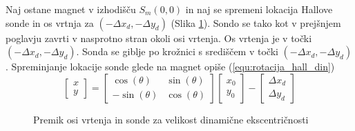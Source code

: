 Naj ostane magnet v izhodišču $S_m(0,0)$ in naj se spremeni lokacija Hallove sonde in os vrtnja za $(-\Delta x_d,-\Delta y_d)$ (Slika \ref{fig:def_din_eksbac}). Sondo se tako kot v prejšnjem poglavju zavrti 
v nasprotno stran okoli osi vrtenja. Os vrtenja je v točki $(-\Delta x_d,-\Delta y_d)$. Sonda se giblje po krožnici s središčem v točki $(-\Delta x_d,-\Delta y_d)$. Spreminjanje lokacije sonde glede na 
magnet opiše (\ref{equ:rotacija_hall_din})
\begin{equation}
\label{equ:rotacija_hall_din}
\begin{bmatrix} x\\y \end{bmatrix}=
\begin{bmatrix} \cos(\theta)&\sin(\theta)\\-\sin(\theta)&\cos(\theta) \end{bmatrix}
\begin{bmatrix} x_0\\y_0 \end{bmatrix}
-
\begin{bmatrix} \Delta x_d\\\Delta y_d \end{bmatrix}
\end{equation}
\begin{figure}[!ht]
	\centering
	\caption{Premik osi vrtenja in sonde za velikost dinamične ekscentričnosti}
	\label{fig:def_din_eksbac}
\end{figure}
